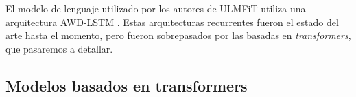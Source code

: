 El modelo de lenguaje utilizado por los autores de ULMFiT utiliza una arquitectura AWD-LSTM \cite{merity2018regularizing}. Estas arquitecturas recurrentes fueron el estado del arte hasta el momento, pero fueron sobrepasados por las basadas en \emph{transformers}, que pasaremos a detallar.


\subsection{Modelos basados en transformers}
\label{sec:02_transformers}
